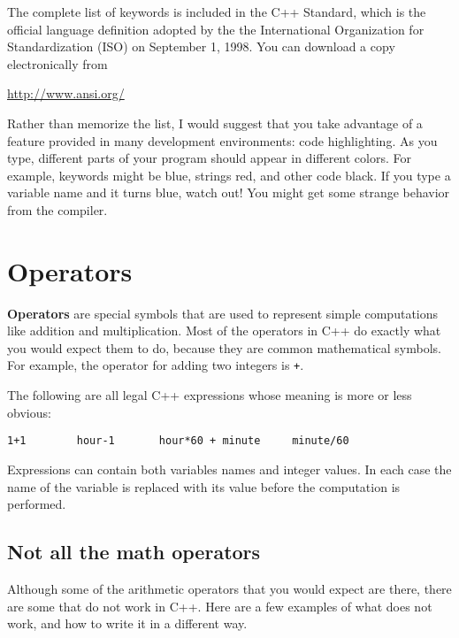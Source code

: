 The complete list of keywords is included in the C++ Standard, which
is the official language definition adopted by the the International
Organization for Standardization (ISO) on September 1, 1998.  You
can download a copy electronically from
\bigskip

    \url{http://www.ansi.org/}
%
\bigskip

Rather than memorize the list, I would suggest that you
take advantage of a feature provided in many development
environments: code highlighting.  As you type, different
parts of your program should appear in different colors.  For
example, keywords might be blue, strings red, and other code
black.  If you type a variable name and it turns blue, watch
out!  You might get some strange behavior from the compiler.

\section{Operators}

{\bf Operators} are special symbols that are used to represent
simple computations like addition and multiplication.  Most
of the operators in C++ do exactly what you would expect them
to do, because they are common mathematical symbols.  For
example, the operator for adding two integers is {\tt +}.

The following are all legal C++ expressions whose meaning is
more or less obvious:

\begin{verbatim}
1+1        hour-1       hour*60 + minute     minute/60
\end{verbatim}
%
Expressions can contain both variables
names and integer values.  In each case the name of the variable is
replaced with its value before the computation is performed.


\subsection{Not all the math operators}
Although some of the arithmetic operators that you would expect are there, there are some that do not work in C++. Here are a few examples of what does not work, and how to write it in a different way.


